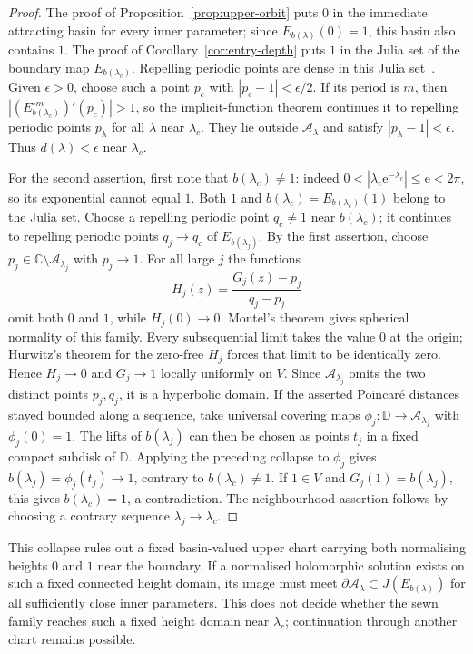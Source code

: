 \documentclass[11pt,a4paper]{article}
\theoremstyle{definition}
\newcommand{\eee}{\mathrm{e}}
\begin{document}
\begin{proof}
The proof of Proposition~\ref{prop:upper-orbit} puts $0$ in the
immediate attracting basin for every inner parameter; since
$E_{b(\lambda)}(0)=1$, this basin also contains $1$.  The proof of
Corollary~\ref{cor:entry-depth} puts $1$ in the Julia set of the
boundary map $E_{b(\lambda_c)}$.  Repelling periodic points are dense
in this Julia set~\cite[Thm.~4]{Bergweiler1993}.  Given $\epsilon>0$,
choose such a point $p_c$ with $|p_c-1|<\epsilon/2$.
If its period is $m$, then
$|(E_{b(\lambda_c)}^{\circ m})'(p_c)|>1$, so the implicit-function
theorem continues it to repelling periodic points $p_\lambda$ for
all $\lambda$ near $\lambda_c$.  They lie outside
$\mathcal A_\lambda$ and satisfy $|p_\lambda-1|<\epsilon$.
Thus $d(\lambda)<\epsilon$ near $\lambda_c$.

For the second assertion, first note that $b(\lambda_c)\ne1$: indeed
$0<|\lambda_c\eee^{-\lambda_c}|\le\eee<2\pi$, so its exponential
cannot equal $1$.  Both $1$ and $b(\lambda_c)=E_{b(\lambda_c)}(1)$
belong to the Julia set.  Choose a repelling periodic point
$q_c\ne1$ near $b(\lambda_c)$; it continues to repelling periodic
points $q_j\to q_c$ of $E_{b(\lambda_j)}$.
By the first assertion, choose
$p_j\in\mathbb C\setminus\mathcal A_{\lambda_j}$ with $p_j\to1$.
For all large $j$ the functions
\[
 H_j(z)=\frac{G_j(z)-p_j}{q_j-p_j}
\]
omit both $0$ and $1$, while $H_j(0)\to0$.
Montel's theorem gives spherical normality of this family.  Every
subsequential limit takes the value $0$ at the origin; Hurwitz's theorem
for the zero-free $H_j$ forces that limit to be identically zero.
Hence $H_j\to0$ and $G_j\to1$ locally uniformly on $V$.
Since $\mathcal A_{\lambda_j}$ omits the two distinct points
$p_j,q_j$, it is a hyperbolic domain.
If the asserted Poincar\'e distances stayed bounded along a sequence,
take universal covering maps
$\phi_j:\mathbb D\to\mathcal A_{\lambda_j}$ with $\phi_j(0)=1$.
The lifts of $b(\lambda_j)$ can then be chosen as points $t_j$ in a
fixed compact subdisk of $\mathbb D$.  Applying the preceding collapse
to $\phi_j$ gives
$b(\lambda_j)=\phi_j(t_j)\to1$, contrary to $b(\lambda_c)\ne1$.
If $1\in V$ and $G_j(1)=b(\lambda_j)$, this gives
$b(\lambda_c)=1$, a contradiction.  The neighbourhood assertion follows
by choosing a contrary sequence $\lambda_j\to\lambda_c$.
\end{proof}

This collapse rules out a fixed basin-valued upper chart carrying
both normalising heights $0$ and $1$ near the boundary.  If a normalised
holomorphic solution exists on such a fixed connected height domain,
its image must meet
$\partial\mathcal A_\lambda\subset J(E_{b(\lambda)})$
for all sufficiently close inner parameters.  This does not
decide whether the sewn family reaches such a fixed height domain
near $\lambda_c$; continuation through another chart remains possible.
\end{document}
